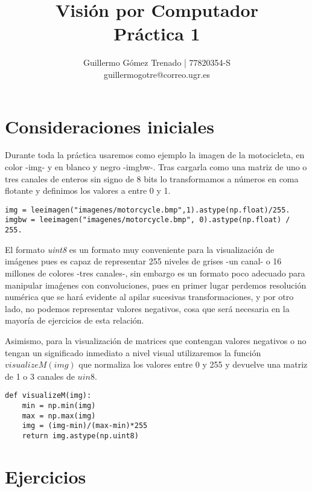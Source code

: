 \documentclass{article}
\title{Visión por Computador\\
Práctica 1}
\author{Guillermo G\'omez Trenado | 77820354-S \\
guillermogotre@correo.ugr.es}
\begin{document}

\maketitle

\tableofcontents

\newpage

\section{Consideraciones iniciales}

Durante toda la práctica usaremos como ejemplo la imagen de la motocicleta, en color -img- y en blanco y negro -imgbw-. Tras cargarla como una matriz de uno o tres canales de enteros sin signo de 8 bits lo transformamos a números en coma flotante y definimos los valores a entre 0 y 1.

\begin{lstlisting}
img = leeimagen("imagenes/motorcycle.bmp",1).astype(np.float)/255.
imgbw = leeimagen("imagenes/motorcycle.bmp", 0).astype(np.float) / 255.
\end{lstlisting}

El formato \textit{uint8} es un formato muy conveniente para la visualización de imágenes pues es capaz de representar 255 niveles de grises -un canal- o 16 millones de colores -tres canales-, sin embargo es un formato poco adecuado para manipular imaǵenes con convoluciones, pues en primer lugar perdemos resolución numérica que se hará evidente al apilar sucesivas transformaciones, y por otro lado, no podemos representar valores negativos, cosa que será necesaria en la mayoría de ejercicios de esta relación.

Asimismo, para la visualización de matrices que contengan valores negativos o no tengan un significado inmediato a nivel visual utilizaremos la función $visualizeM(img)$ que normaliza los valores entre 0 y 255 y devuelve una matriz de 1 o 3 canales de $uin8$.

\begin{lstlisting}
def visualizeM(img):
    min = np.min(img)
    max = np.max(img)
    img = (img-min)/(max-min)*255
    return img.astype(np.uint8)
\end{lstlisting}

\section{Ejercicios}
\end{document}

